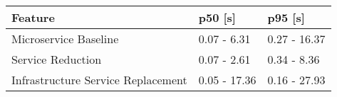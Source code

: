 \begin{tabular}{lll}
\toprule
Feature & p50 [s] & p95 [s] \\
\midrule
Microservice Baseline & 0.07 - 6.31 & 0.27 - 16.37 \\
Service Reduction & 0.07 - 2.61 & 0.34 - 8.36 \\
Infrastructure Service Replacement & 0.05 - 17.36 & 0.16 - 27.93 \\
\bottomrule
\end{tabular}

